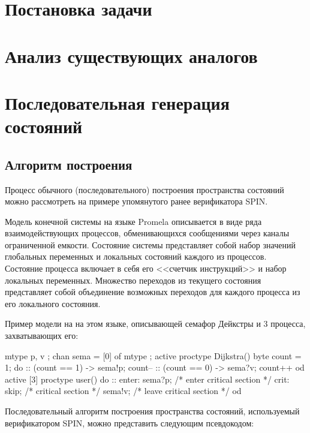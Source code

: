 \documentclass[utf8]{G7-32}
\begin{document}
\mainmatter

\chapter{Постановка задачи}
\label{cha:whats-this-about}

\chapter{Анализ существующих аналогов}
\label{cha:analogs}

\chapter{Последовательная генерация состояний}
\label{sec:seq-statespace}

\section{Алгоритм построения}
\label{sec:seq-algo}

Процесс обычного (последовательного) построения пространства состояний
можно рассмотреть на примере упомянутого ранее верификатора SPIN.

Модель конечной системы на языке Promela описывается в виде ряда
взаимодействующих процессов, обменивающихся сообщениями через каналы
ограниченной емкости. Состояние системы представляет собой набор
значений глобальных переменных и локальных состояний каждого из
процессов. Состояние процесса включает в себя его <<счетчик инструкций>>
и набор локальных переменных. Множество переходов из текущего
состояния представляет собой объединение возможных переходов для
каждого процесса из его локального состояния.

Пример модели на на этом языке, описывающей семафор Дейкстры и 3
процесса, захватывающих его:

\begin{CodeBlock}
mtype { p, v };
chan sema = [0] of { mtype };
active proctype Dijkstra()
{      byte count = 1;
       do
       :: (count == 1) ->
               sema!p; count--
       :: (count == 0) ->
               sema?v; count++
       od
}
active [3] proctype user()
{       do
        :: enter: sema?p; /* enter critical section */
            crit: skip;   /* critical section */
                  sema!v; /* leave critical section */
        od
}
\end{CodeBlock}

Последовательный алгоритм построения пространства состояний,
используемый верификатором SPIN, можно представить следующим
псевдокодом:
\end{document}
